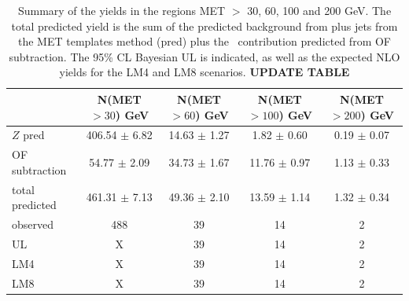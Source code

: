 \begin{table}[htb]
\begin{center}
\caption{\label{resultsyieldtable} 
Summary of the yields in the regions MET $>$ 30, 60, 100 and 200 GeV. The total predicted yield is the sum of the
predicted background from \Z plus jets from the MET templates method (\Z pred) plus the \ttbar\ contribution
predicted from OF subtraction. The 95\% CL Bayesian UL is indicated, as well as the expected NLO yields for the
LM4 and LM8 scenarios.
{\bf UPDATE TABLE}
}
    \begin{tabular}{lcccc}
\hline
                        &   N(MET $>30$)  GeV    &   N(MET $>60$)  GeV    &   N(MET $>100$) GeV    &   N(MET $>200$) GeV \\
\hline
      $Z$ pred    &  406.54  $\pm$  6.82  &   14.63  $\pm$  1.27  &    1.82  $\pm$  0.60  &    0.19  $\pm$  0.07 \\
 OF subtraction   &   54.77  $\pm$  2.09  &   34.73  $\pm$  1.67  &   11.76  $\pm$  0.97  &    1.13  $\pm$  0.33 \\
\hline
 total predicted  &  461.31  $\pm$  7.13  &   49.36  $\pm$  2.10  &   13.59  $\pm$  1.14  &    1.32  $\pm$  0.34 \\
\hline
      observed    &                  488  &                   39  &                   14  &                    2 \\
\hline
            UL    &                    X  &                   39  &                   14  &                    2 \\
\hline
           LM4    &                    X  &                   39  &                   14  &                    2 \\
           LM8    &                    X  &                   39  &                   14  &                    2 \\
\hline
\end{tabular}
\end{center}
\end{table}

